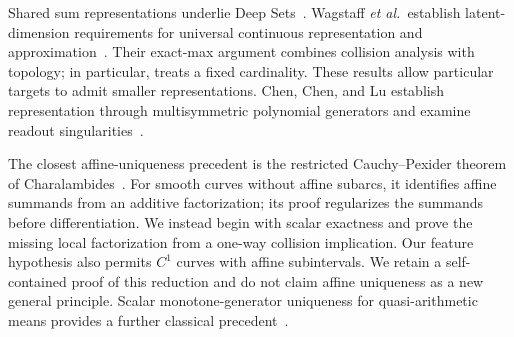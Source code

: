 Shared sum representations underlie Deep Sets~\cite{zaheer2017}. Wagstaff \emph{et al.}\ establish latent-dimension requirements for universal continuous representation and approximation~\cite{wagstaff19,wagstaff22}. Their exact-max argument combines collision analysis with topology; in particular, \cite[Lemma 17]{wagstaff22} treats a fixed cardinality. These results allow particular targets to admit smaller representations. Chen, Chen, and Lu establish representation through multisymmetric polynomial generators and examine readout singularities~\cite{chen2024}.

The closest affine-uniqueness precedent is the restricted Cauchy--Pexider theorem of Charalambides~\cite[Theorem 1.6]{charalambides2013}. For smooth curves without affine subarcs, it identifies affine summands from an additive factorization; its proof regularizes the summands before differentiation. We instead begin with scalar exactness and prove the missing local factorization from a one-way collision implication. Our feature hypothesis also permits $C^1$ curves with affine subintervals. We retain a self-contained proof of this reduction and do not claim affine uniqueness as a new general principle. Scalar monotone-generator uniqueness for quasi-arithmetic means provides a further classical precedent~\cite[Theorems A and D]{matkowski2015}.


